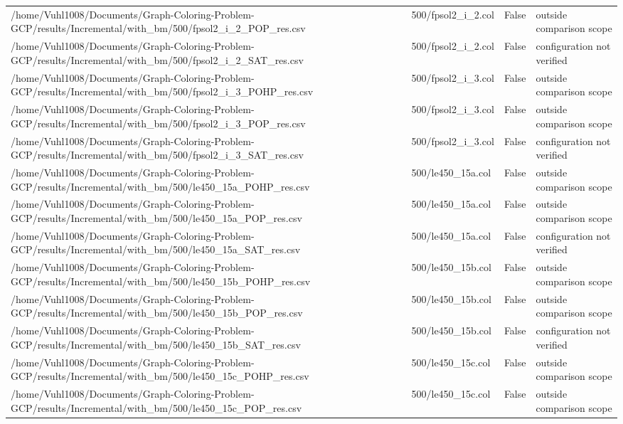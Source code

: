 \begin{table}[htbp]
\begin{tabular}{llll}
/home/Vuhl1008/Documents/Graph-Coloring-Problem-GCP/results/Incremental/with\_bm/500/fpsol2\_i\_2\_POP\_res.csv & 500/fpsol2\_i\_2.col & False & outside comparison scope \\
/home/Vuhl1008/Documents/Graph-Coloring-Problem-GCP/results/Incremental/with\_bm/500/fpsol2\_i\_2\_SAT\_res.csv & 500/fpsol2\_i\_2.col & False & configuration not verified \\
/home/Vuhl1008/Documents/Graph-Coloring-Problem-GCP/results/Incremental/with\_bm/500/fpsol2\_i\_3\_POHP\_res.csv & 500/fpsol2\_i\_3.col & False & outside comparison scope \\
/home/Vuhl1008/Documents/Graph-Coloring-Problem-GCP/results/Incremental/with\_bm/500/fpsol2\_i\_3\_POP\_res.csv & 500/fpsol2\_i\_3.col & False & outside comparison scope \\
/home/Vuhl1008/Documents/Graph-Coloring-Problem-GCP/results/Incremental/with\_bm/500/fpsol2\_i\_3\_SAT\_res.csv & 500/fpsol2\_i\_3.col & False & configuration not verified \\
/home/Vuhl1008/Documents/Graph-Coloring-Problem-GCP/results/Incremental/with\_bm/500/le450\_15a\_POHP\_res.csv & 500/le450\_15a.col & False & outside comparison scope \\
/home/Vuhl1008/Documents/Graph-Coloring-Problem-GCP/results/Incremental/with\_bm/500/le450\_15a\_POP\_res.csv & 500/le450\_15a.col & False & outside comparison scope \\
/home/Vuhl1008/Documents/Graph-Coloring-Problem-GCP/results/Incremental/with\_bm/500/le450\_15a\_SAT\_res.csv & 500/le450\_15a.col & False & configuration not verified \\
/home/Vuhl1008/Documents/Graph-Coloring-Problem-GCP/results/Incremental/with\_bm/500/le450\_15b\_POHP\_res.csv & 500/le450\_15b.col & False & outside comparison scope \\
/home/Vuhl1008/Documents/Graph-Coloring-Problem-GCP/results/Incremental/with\_bm/500/le450\_15b\_POP\_res.csv & 500/le450\_15b.col & False & outside comparison scope \\
/home/Vuhl1008/Documents/Graph-Coloring-Problem-GCP/results/Incremental/with\_bm/500/le450\_15b\_SAT\_res.csv & 500/le450\_15b.col & False & configuration not verified \\
/home/Vuhl1008/Documents/Graph-Coloring-Problem-GCP/results/Incremental/with\_bm/500/le450\_15c\_POHP\_res.csv & 500/le450\_15c.col & False & outside comparison scope \\
/home/Vuhl1008/Documents/Graph-Coloring-Problem-GCP/results/Incremental/with\_bm/500/le450\_15c\_POP\_res.csv & 500/le450\_15c.col & False & outside comparison scope \\

\end{tabular}
\end{table}
